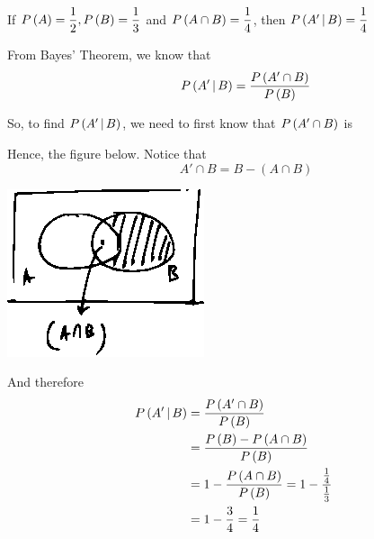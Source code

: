 \documentclass[14pt,fleqn]{extarticle}
\begin{document}
 
\begin{snippet}
    \correct
    
    If $P\left( A\right) = \dfrac{1}{2}, P\left( B\right) = \dfrac{1}{3}$ and $P\left( A\cap B\right)=\dfrac{1}{4}$, then $P\left(A'\,\vert\,B\right) = \dfrac{1}{4}$ 
    
    \reason
    
    From Bayes' Theorem, we know that 
    \[\qquad P\left(A'\,\vert\,B\right) = \dfrac{P\left( A'\cap B\right)}{P\left( B\right)} \]
    
    So, to find $P\left(A'\,\vert\,B\right)$, we need to first know that $P\left( A'\cap B\right)$ is \newline 
    
    Hence, the figure below. Notice that 
    \[\qquad A'\cap B = B - \left(A\cap B \right)\]
    \begin{center}
\includegraphics[scale=2]{100-A.eps}
\end{center}

And therefore 
\begin{align}
	P\left(A'\,\vert\,B\right) &= \dfrac{P\left( A'\cap B\right)}{P\left( B\right)} \\
	&= \dfrac{P\left( B\right) - P\left( A\cap B\right)}{P\left( B\right)} \\
	&= 1- \dfrac{P\left( A\cap B\right)}{P\left( B\right)} = 1- \dfrac{\frac{1}{4}}{\frac{1}{3}} \\
	&= 1-\frac{3}{4} = \frac{1}{4} 
\end{align}
    
\end{snippet} 
\end{document}
